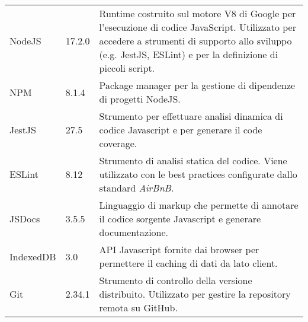 {\begin{longtable}{|C{2.5cm}|C{2cm}|L{9cm}|}
   \\ \hline
  NodeJS       & 17.2.0    & Runtime costruito sul motore V8 di Google per l'esecuzione di codice JavaScript. Utilizzato per accedere a strumenti di supporto allo sviluppo (e.g. JestJS, ESLint) e per la definizione di piccoli script. \\  \hline
  NPM       & 8.1.4    & Package manager per la gestione di dipendenze di progetti NodeJS. \\  \hline
  JestJS       & 27.5    & Strumento per effettuare analisi dinamica di codice Javascript e per generare il code coverage. \\  \hline
  ESLint       & 8.12    & Strumento di analisi statica del codice. Viene utilizzato con le best practices configurate dallo standard \textit{AirBnB}. \\  \hline
  JSDocs       & 3.5.5    & Linguaggio di markup che permette di annotare il codice sorgente Javascript e generare documentazione. \\  \hline
  IndexedDB       & 3.0    & API Javascript fornite dai browser per permettere il caching di dati da lato client. \\  \hline
  Git       & 2.34.1    & Strumento di controllo della versione distribuito. Utilizzato per gestire la repository remota su GitHub. \\  \hline
  
\end{longtable}}

\renewcommand\arraystretch{1}